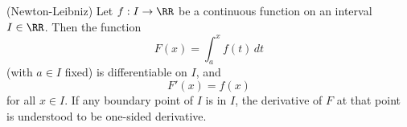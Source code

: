 

\begin{theorem}
(Newton-Leibniz) Let $f:I\to \RR$ be a continuous function on an 
interval $I\in \RR$. Then the function
$$
F(x) = \int_a^x f(t)\,dt
$$
(with $a\in I$ fixed) is differentiable on $I$, and  
$$
F'(x) = f(x)
$$
for all $x\in I$. If any boundary point of $I$ is in $I$, the 
derivative of $F$ at that point is understood to be one-sided 
derivative.
\end{theorem}

